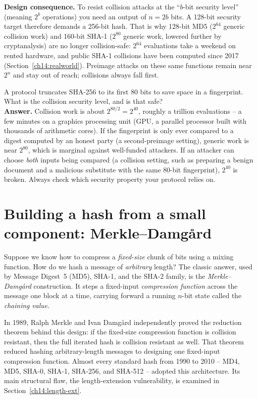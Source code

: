 \begin{focusbox}
\textbf{Design consequence.} To resist collision attacks at the ``$b$-bit security level'' (meaning $2^{b}$ operations) you need an output of $n = 2b$ bits. A 128-bit security target therefore demands a 256-bit hash. That is why 128-bit MD5 ($2^{64}$ generic collision work) and 160-bit SHA-1 ($2^{80}$ generic work, lowered further by cryptanalysis) are no longer collision-safe: $2^{64}$ evaluations take a weekend on rented hardware, and public SHA-1 collisions have been computed since 2017 (Section~\ref{ch14:realworld}). Preimage attacks on these same functions remain near $2^{n}$ and stay out of reach; collisions always fall first.
\end{focusbox}

\begin{walkbox}
A protocol truncates SHA-256 to its first 80 bits to save space in a fingerprint. What is the collision security level, and is that safe? \\[0.3em]
\textbf{Answer.} Collision work is about $2^{80/2} = 2^{40}$, roughly a trillion evaluations -- a few minutes on a graphics processing unit (GPU, a parallel processor built with thousands of arithmetic cores). If the fingerprint is only ever compared to a digest computed by an honest party (a second-preimage setting), generic work is near $2^{80}$, which is marginal against well-funded attackers. If an attacker can choose \emph{both} inputs being compared (a collision setting, such as preparing a benign document and a malicious substitute with the same 80-bit fingerprint), $2^{40}$ is broken. Always check which security property your protocol relies on.
\end{walkbox}

\section{Building a hash from a small component: Merkle--Damg\aa{}rd}
\label{ch14:md}

Suppose we know how to compress a \emph{fixed-size} chunk of bits using a mixing function. How do we hash a message of \emph{arbitrary} length? The classic answer, used by Message Digest~5 (MD5), SHA-1, and the SHA-2 family, is the \emph{Merkle--Damg\aa{}rd} construction. It steps a fixed-input \emph{compression function} across the message one block at a time, carrying forward a running $n$-bit state called the \emph{chaining value}.

In 1989, Ralph Merkle and Ivan Damg\aa{}rd independently proved the reduction theorem behind this design: if the fixed-size compression function is collision resistant, then the full iterated hash is collision resistant as well. That theorem reduced hashing arbitrary-length messages to designing one fixed-input compression function. Almost every standard hash from 1990 to 2010 -- MD4, MD5, SHA-0, SHA-1, SHA-256, and SHA-512 -- adopted this architecture. Its main structural flaw, the length-extension vulnerability, is examined in Section~\ref{ch14:length-ext}.


